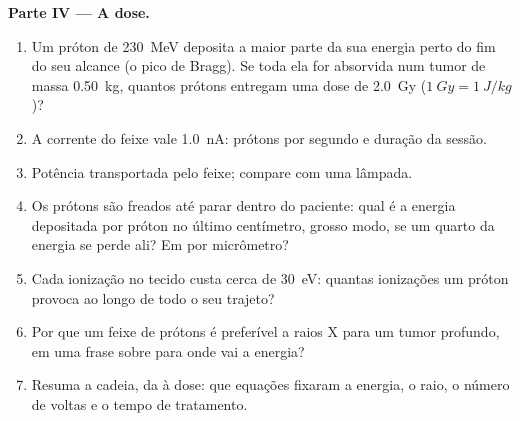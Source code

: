 \begin{problem}
\medskip
\noindent\textbf{Parte IV --- A dose.}
\begin{enumerate}[resume]
  \item Um próton de \qty{230}{MeV} deposita a maior parte da sua energia perto do fim
        do seu alcance (o pico de Bragg). Se toda ela for absorvida num
        tumor de massa \qty{0.50}{kg}, quantos prótons entregam uma dose de
        \qty{2.0}{Gy} ($\qty{1}{Gy} = \qty{1}{J/kg}$)?
  \item A corrente do feixe vale \qty{1.0}{nA}: prótons por segundo e
        duração da sessão.
  \item Potência transportada pelo feixe; compare com uma lâmpada.
  \item Os prótons são freados até parar dentro do paciente: qual é a
        energia depositada por próton no último centímetro, grosso modo, se
        um quarto da energia se perde ali? Em  por
        micrômetro?
  \item Cada ionização no tecido custa cerca de \qty{30}{eV}: quantas
        ionizações um próton provoca ao longo de todo o seu trajeto?
  \item Por que um feixe de prótons é preferível a raios X para um tumor profundo, em
        uma frase sobre para onde vai a energia?
  \item Resuma a cadeia, da  à dose: que
        equações fixaram a energia, o raio, o número de voltas e
        o tempo de tratamento.
\end{enumerate}
\end{problem}
